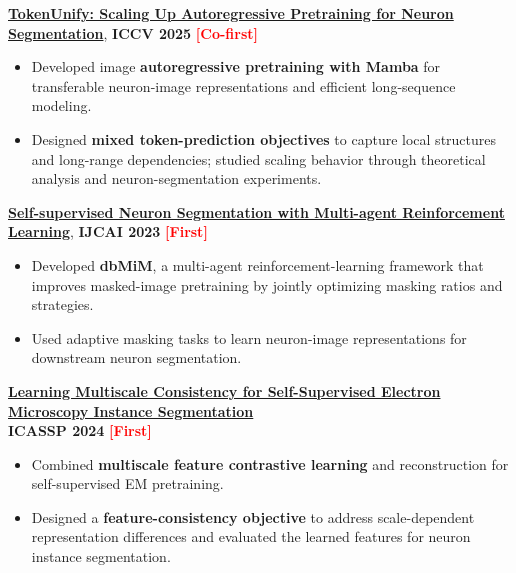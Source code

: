\documentclass{resume}
\begin{document}
\begin{enumerate}[label=\textbf{[\arabic*]}, leftmargin=2em, itemsep=3pt]
    \item \textbf{\href{https://openaccess.thecvf.com/content/ICCV2025/html/Chen_TokenUnify_Scaling_Up_Autoregressive_Pretraining_for_Neuron_Segmentation_ICCV_2025_paper.html}{TokenUnify: Scaling Up Autoregressive Pretraining for Neuron Segmentation}}, \textbf{ICCV 2025} \hfill \mbox{\textcolor{red}{\textbf{[Co-first]}}}
    \begin{itemize}
        \item Developed image \textbf{autoregressive pretraining with Mamba} for transferable neuron-image representations and efficient long-sequence modeling.
        \item Designed \textbf{mixed token-prediction objectives} to capture local structures and long-range dependencies; studied scaling behavior through theoretical analysis and neuron-segmentation experiments.
    \end{itemize}

\begin{samepage}
    \item \textbf{\href{https://www.ijcai.org/proceedings/2023/0068.pdf}{Self-supervised Neuron Segmentation with Multi-agent Reinforcement Learning}}, \textbf{IJCAI 2023} \hfill \mbox{\textcolor{red}{\textbf{[First]}}}
    \begin{itemize}
        \item Developed \textbf{dbMiM}, a multi-agent reinforcement-learning framework that improves masked-image pretraining by jointly optimizing masking ratios and strategies.
        \item Used adaptive masking tasks to learn neuron-image representations for downstream neuron segmentation.
    \end{itemize}
\end{samepage}

    \item \textbf{\href{https://arxiv.org/abs/2308.09917}{Learning Multiscale Consistency for Self-Supervised Electron Microscopy Instance Segmentation}} \\
    \textbf{ICASSP 2024} \hfill \mbox{\textcolor{red}{\textbf{[First]}}}
    \begin{itemize}
        \item Combined \textbf{multiscale feature contrastive learning} and reconstruction for self-supervised EM pretraining.
        \item Designed a \textbf{feature-consistency objective} to address scale-dependent representation differences and evaluated the learned features for neuron instance segmentation.
    \end{itemize}

\end{enumerate}
\end{document}

